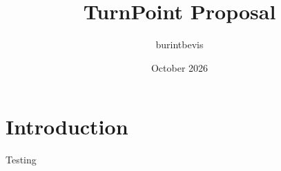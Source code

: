 \documentclass{article}
\title{TurnPoint Proposal}
\author{burintbevis }
\date{October 2026}
\begin{document}
\maketitle

\section{Introduction}
Testing
\end{document}
